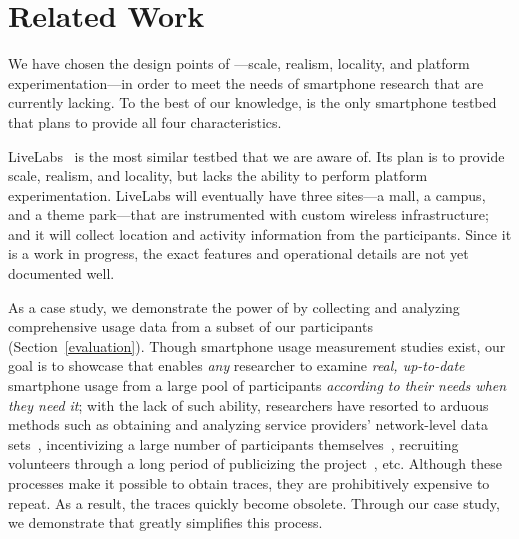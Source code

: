 \section{Related Work}
\label{sec:related}

We have chosen the design points of \PhoneLab{}---scale, realism, locality, and
platform experimentation---in order to meet the needs of smartphone research
that are currently lacking. To the best of our knowledge, \PhoneLab{} is the
only smartphone testbed that plans to provide all four characteristics.

LiveLabs~\cite{livelabs} is the most similar testbed that we are aware of. Its
plan is to provide scale, realism, and locality, but lacks the ability to
perform platform experimentation. LiveLabs will eventually have three sites---a
mall, a campus, and a theme park---that are instrumented with custom wireless
infrastructure; and it will collect location and activity information from the
participants. Since it is a work in progress, the exact features and operational
details are not yet documented well.

As a case study, we demonstrate the power of \PhoneLab{} by collecting and
analyzing comprehensive usage data from a subset of our participants
(Section~\ref{evaluation}). Though smartphone usage measurement studies exist,
our goal is to showcase that \PhoneLab{} enables {\it any} researcher to
examine {\it real, up-to-date} smartphone usage from a large pool of
participants {\it according to their needs when they need it}; with the lack of
such ability, researchers have resorted to arduous methods such as obtaining and
analyzing service providers' network-level data sets~\cite{xu:imc:2011,
trestian:imc:2009, trestian:ton:2012}, incentivizing a large number of
participants themselves~\cite{falaki:mobisys:2010}, recruiting volunteers
through a long period of publicizing the project~\cite{shye:micro:2009}, etc.
Although these processes make it possible to obtain traces, they are
prohibitively expensive to repeat. As a result, the traces quickly become
obsolete. Through our case study, we demonstrate that \PhoneLab{} greatly
simplifies this process.

